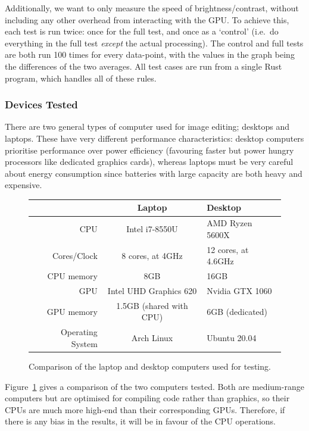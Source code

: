 \documentclass[12pt]{article}
\begin{document}
Additionally, we want to only measure the speed of brightness/contrast, without including any other
overhead from interacting with the GPU.  To achieve this, each test is run twice: once for the full
test, and once as a `control' (i.e.\ do everything in the full test \emph{except} the actual
processing).  The control and full tests are both run 100 times for every data-point, with the
values in the graph being the differences of the two averages.  All test cases are run from a single
Rust program, which handles all of these rules.

\subsubsection{Devices Tested}

There are two general types of computer used for image editing; desktops and laptops.  These have
very different performance characteristics: desktop computers prioritise performance over power
efficiency (favouring faster but power hungry processors like dedicated graphics cards), whereas
laptops must be very careful about energy consumption since batteries with large capacity are both
heavy and expensive.

\begin{figure}
    \begin{center}
        \begin{tabular}{ r | c | l }
                & Laptop & Desktop \\
            \hline
            CPU & Intel i7-8550U      & AMD Ryzen 5600X \\
            Cores/Clock & 8 cores, at 4GHz & 12 cores, at 4.6GHz \\
            CPU memory & 8GB & 16GB \\
            \hline
            GPU & Intel UHD Graphics 620 & Nvidia GTX 1060 \\
            GPU memory & 1.5GB (shared with CPU) & 6GB (dedicated) \\
            \hline
            Operating System & Arch Linux & Ubuntu 20.04 \\
            \hline
        \end{tabular}
    \end{center}
    \caption{Comparison of the laptop and desktop computers used for
    testing.}\label{fig:test-computers}
\end{figure}

Figure~\ref{fig:test-computers} gives a comparison of the two computers tested.  Both are
medium-range computers but are optimised for compiling code rather than graphics, so their CPUs are
much more high-end than their corresponding GPUs.  Therefore, if there is any bias in the results,
it will be in favour of the CPU operations.
\end{document}
